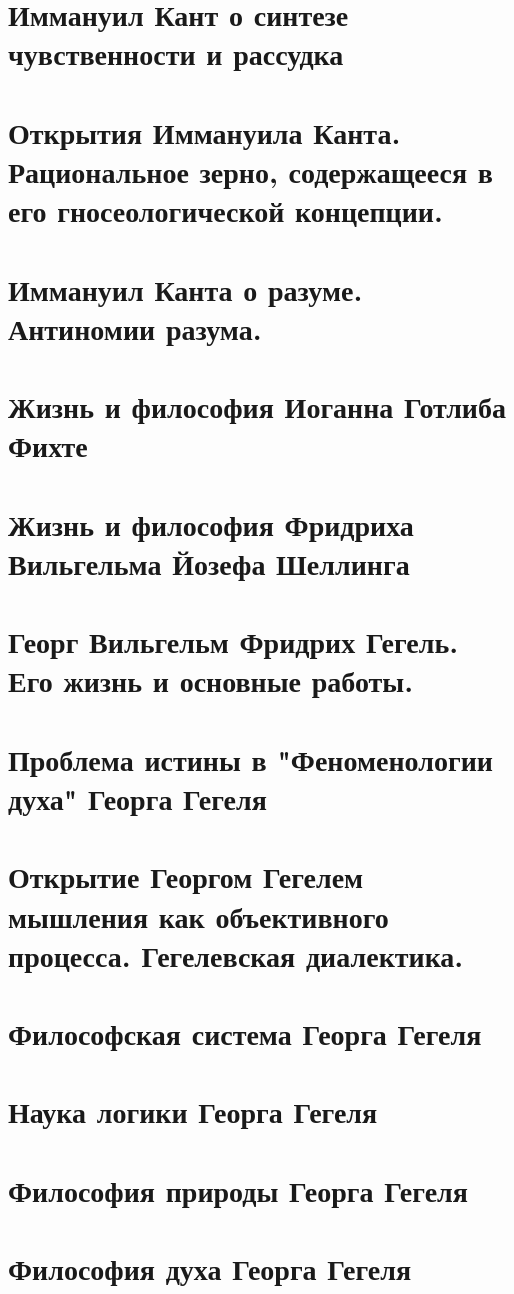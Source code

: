 \section{Иммануил Кант о синтезе чувственности и рассудка}
\section{Открытия Иммануила Канта. Рациональное зерно, содержащееся в его гносеологической концепции.}
\section{Иммануил Канта о разуме. Антиномии разума.}
\section{Жизнь и философия Иоганна Готлиба Фихте}
\section{Жизнь и философия Фридриха Вильгельма Йозефа Шеллинга}
\section{Георг Вильгельм Фридрих Гегель. Его жизнь и основные работы.}
\section{Проблема истины в "Феноменологии духа" Георга Гегеля}
\section{Открытие Георгом Гегелем мышления как объективного процесса. Гегелевская диалектика.}
\section{Философская система Георга Гегеля}
\section{Наука логики Георга Гегеля}
\section{Философия природы Георга Гегеля}
\section{Философия духа Георга Гегеля}
